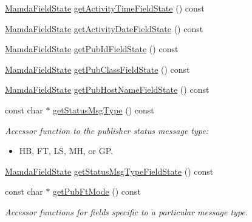 \begin{CompactItemize}
\item 
\hyperlink{namespaceWombat_93aac974f2ab713554fd12a1fa3b7d2a}{Mamda\-Field\-State} \hyperlink{classWombat_1_1MamdaPubStatusListener_4a6dd432e42df809ec71070125d617e5}{get\-Activity\-Time\-Field\-State} () const 
\item 
\hyperlink{namespaceWombat_93aac974f2ab713554fd12a1fa3b7d2a}{Mamda\-Field\-State} \hyperlink{classWombat_1_1MamdaPubStatusListener_978079b77f029cc821ff70b4b381f80f}{get\-Activity\-Date\-Field\-State} () const 
\item 
\hyperlink{namespaceWombat_93aac974f2ab713554fd12a1fa3b7d2a}{Mamda\-Field\-State} \hyperlink{classWombat_1_1MamdaPubStatusListener_b6166da7512cfa7b06bb971eb945a39a}{get\-Pub\-Id\-Field\-State} () const 
\item 
\hyperlink{namespaceWombat_93aac974f2ab713554fd12a1fa3b7d2a}{Mamda\-Field\-State} \hyperlink{classWombat_1_1MamdaPubStatusListener_ffcb6fab4b381b52cdfe3483f2e2965c}{get\-Pub\-Class\-Field\-State} () const 
\item 
\hyperlink{namespaceWombat_93aac974f2ab713554fd12a1fa3b7d2a}{Mamda\-Field\-State} \hyperlink{classWombat_1_1MamdaPubStatusListener_0113c4afc2de92bbae16a85dbd0b76a5}{get\-Pub\-Host\-Name\-Field\-State} () const 
\item 
const char $\ast$ \hyperlink{classWombat_1_1MamdaPubStatusListener_e18c97b1a454d45755dd48f8a56a742d}{get\-Status\-Msg\-Type} () const 
\begin{CompactList}\small\item\em Accessor function to the publisher status message type:\begin{itemize}
\item HB, FT, LS, MH, or GP. \end{itemize}
\item\end{CompactList}\item 
\hyperlink{namespaceWombat_93aac974f2ab713554fd12a1fa3b7d2a}{Mamda\-Field\-State} \hyperlink{classWombat_1_1MamdaPubStatusListener_f9c9da5b1ab98b723a87fe8a460b3901}{get\-Status\-Msg\-Type\-Field\-State} () const 
\item 
const char $\ast$ \hyperlink{classWombat_1_1MamdaPubStatusListener_1015e3575a3a8473801927af37687d66}{get\-Pub\-Ft\-Mode} () const 
\begin{CompactList}\small\item\em Accessor functions for fields specific to a particular message type. \item\end{CompactList}\item 

\end{CompactItemize}
